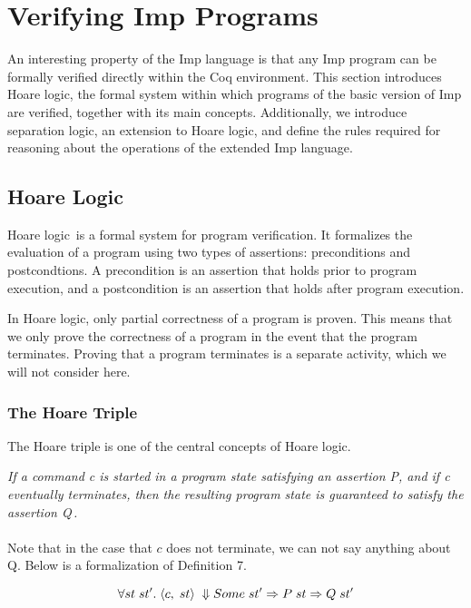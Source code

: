 \section{Verifying Imp Programs}
An interesting property of the Imp language is that any Imp program can be formally verified directly within the Coq environment. This section introduces Hoare logic, the formal system within which programs of the basic version of Imp are verified, together with its main concepts. Additionally, we introduce separation logic, an extension to Hoare logic, and define the rules required for reasoning about the operations of the extended Imp language.
\subsection{Hoare Logic}
\label{sec:hoare_rules}
Hoare logic\,\cite{Hoare69anaxiomatic} is a formal system for program verification. It formalizes the evaluation of a program using two types of assertions: preconditions and postcondtions. A precondition is an assertion that holds prior to program execution, and a postcondition is an assertion that holds after program execution.

In Hoare logic, only partial correctness of a program is proven. This means that we only prove the correctness of a program in the event that the program terminates. Proving that a program terminates is a separate activity, which we will not consider here.
\subsubsection{The Hoare Triple}
The Hoare triple is one of the central concepts of Hoare logic.

 \textit{If a command c is started in a program state satisfying an assertion P, and if c eventually terminates, then the resulting program state is guaranteed to satisfy the assertion Q}\,\cite{Pierce:SF}\textit{.}

\paragraph{}
Note that in the case that $c$ does not terminate, we can not say anything about Q. Below is a formalization of Definition 7.

\[
\forall st\;st'.\;\langle c,\;st\rangle\;\Downarrow Some\; st' \Rightarrow P\;st \Rightarrow Q\;st'
\]

